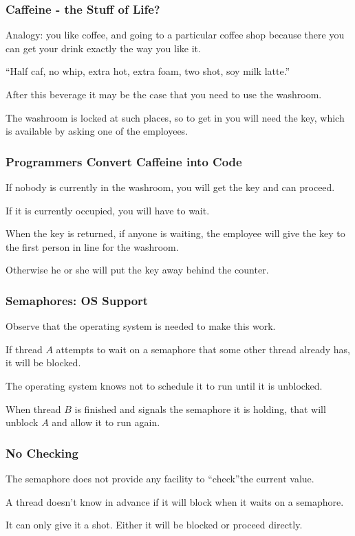 \begin{frame}
\frametitle{Caffeine - the Stuff of Life?}

Analogy: you like coffee, and going to a particular coffee shop because there you can get your drink exactly the way you like it.

``Half caf, no whip, extra hot, extra foam, two shot, soy milk latte.''

After this beverage it may be the case that you need to use the washroom. 

The washroom is locked at such places, so to get in you will need the key, which is available by asking one of the employees. 

\end{frame}

\begin{frame}
\frametitle{Programmers Convert Caffeine into Code}

If nobody is currently in the washroom, you will get the key and can proceed. 

If it is currently occupied, you will have to wait. 

When the key is returned, if anyone is waiting, the employee will give the key to the first person in line for the washroom. 

Otherwise he or she will put the key away behind the counter.


\end{frame}

\begin{frame}
\frametitle{Semaphores: OS Support}

Observe that the operating system is needed to make this work. 

If thread $A$ attempts to wait on a semaphore that some other thread already has, it will be blocked. 

The operating system knows not to schedule it to run until it is unblocked. 

When thread $B$ is finished and signals the semaphore it is holding, that will unblock $A$ and allow it to run again.


\end{frame}

\begin{frame}
\frametitle{No Checking}


The semaphore does not provide any facility to ``check''the current value. 

A thread doesn't know in advance if it will block when it waits on a semaphore.

It can only give it a shot. Either it will be blocked or proceed directly.

\end{frame}


